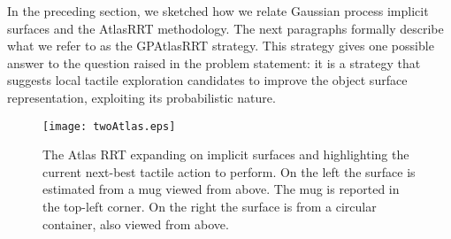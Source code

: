 In the preceding section, we sketched how we relate Gaussian process implicit surfaces and the AtlasRRT methodology. The next paragraphs formally describe what we refer to as the GPAtlasRRT strategy. This strategy gives one possible answer to the question raised in the problem statement: it is a strategy that suggests local tactile exploration candidates to improve the object surface representation, exploiting its probabilistic nature. 

\begin{figure*}[htb]
    \centering
    \texttt{[image: twoAtlas.eps]}
    \caption{The Atlas RRT expanding on implicit surfaces and highlighting the current next-best tactile action to perform. On the left the surface is estimated from a mug viewed from above. The mug is reported in the top-left corner. On the right the surface is from a circular container, also viewed from above.}
    \label{fig:GPAtlasRRTtwo}
\end{figure*}

